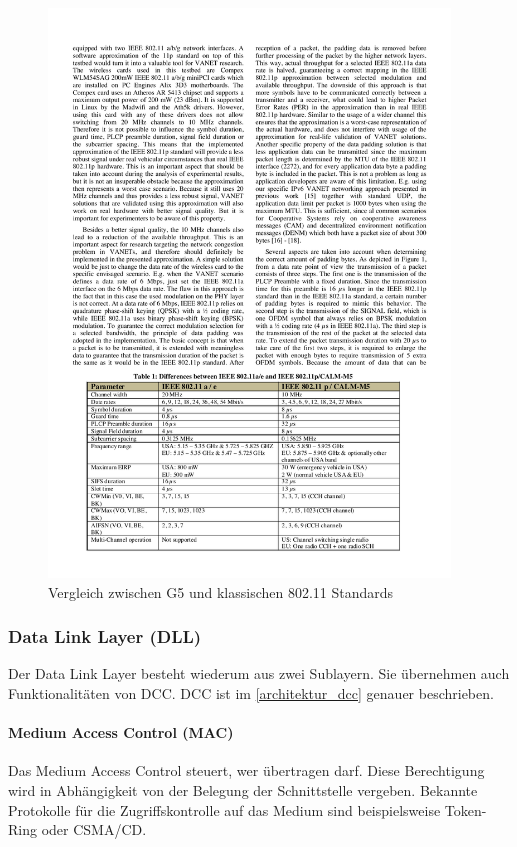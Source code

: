 \begin{figure}
	\includegraphics[width=0.95\textwidth]{content/images/02_architektur/unterschiede-G5-Wlan.pdf}
	\caption{Vergleich zwischen G5 und klassischen 802.11 Standards \cite{g5-wlan-hardware}}
	\label{fig:architektur_vergleich-G5-802}
\end{figure}

\subsubsection{Data Link Layer (DLL)}
Der Data Link Layer besteht wiederum aus zwei Sublayern. Sie übernehmen auch Funktionalitäten von \ac{DCC}. \ac{DCC} ist im \autoref{architektur_dcc} genauer beschrieben. 
\paragraph{Medium Access Control (MAC)}
Das Medium Access Control steuert, wer übertragen darf. Diese Berechtigung wird in Abhängigkeit von der Belegung der Schnittstelle vergeben. Bekannte Protokolle für die Zugriffskontrolle auf das Medium sind beispielsweise Token-Ring oder CSMA/CD. 

